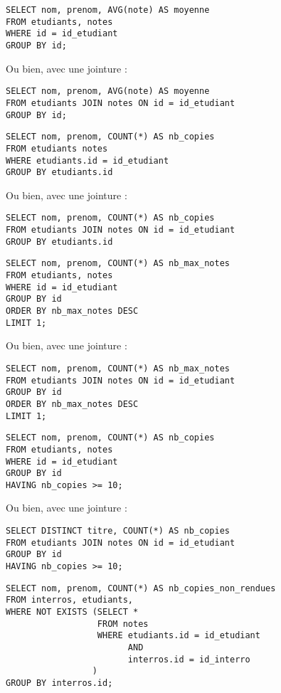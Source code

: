 \medskip{}  
  
\question{}
\begin{verbatim}
SELECT nom, prenom, AVG(note) AS moyenne
FROM etudiants, notes
WHERE id = id_etudiant
GROUP BY id;
\end{verbatim}
Ou bien, avec une jointure : 
\begin{verbatim}
SELECT nom, prenom, AVG(note) AS moyenne
FROM etudiants JOIN notes ON id = id_etudiant
GROUP BY id;
\end{verbatim}

\medskip{}

\question{}
\begin{verbatim}
SELECT nom, prenom, COUNT(*) AS nb_copies
FROM etudiants notes
WHERE etudiants.id = id_etudiant
GROUP BY etudiants.id
\end{verbatim}
Ou bien, avec une jointure : 
\begin{verbatim}
SELECT nom, prenom, COUNT(*) AS nb_copies
FROM etudiants JOIN notes ON id = id_etudiant
GROUP BY etudiants.id
\end{verbatim}

\medskip{}  
  
\question{}
\begin{verbatim}
SELECT nom, prenom, COUNT(*) AS nb_max_notes
FROM etudiants, notes
WHERE id = id_etudiant
GROUP BY id
ORDER BY nb_max_notes DESC
LIMIT 1;
\end{verbatim}
Ou bien, avec une jointure : 
\begin{verbatim}
SELECT nom, prenom, COUNT(*) AS nb_max_notes
FROM etudiants JOIN notes ON id = id_etudiant
GROUP BY id
ORDER BY nb_max_notes DESC
LIMIT 1;
\end{verbatim}

\medskip{}  
  
\question{}
\begin{verbatim}
SELECT nom, prenom, COUNT(*) AS nb_copies
FROM etudiants, notes
WHERE id = id_etudiant
GROUP BY id
HAVING nb_copies >= 10;
\end{verbatim}
Ou bien, avec une jointure : 
\begin{verbatim}
SELECT DISTINCT titre, COUNT(*) AS nb_copies
FROM etudiants JOIN notes ON id = id_etudiant
GROUP BY id
HAVING nb_copies >= 10;
\end{verbatim}

\medskip{}

\question{}
\begin{verbatim}
SELECT nom, prenom, COUNT(*) AS nb_copies_non_rendues
FROM interros, etudiants,
WHERE NOT EXISTS (SELECT *
                  FROM notes
                  WHERE etudiants.id = id_etudiant
                        AND
                        interros.id = id_interro
                 )
GROUP BY interros.id;
\end{verbatim}

